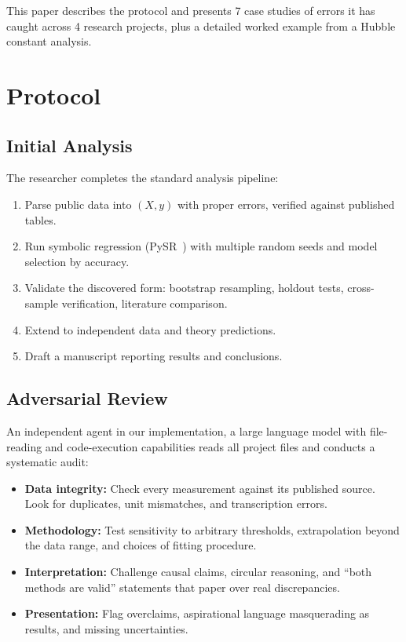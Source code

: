 \documentclass[twocolumn]{aastex631}
\begin{document}
This paper describes the protocol and presents 7 case studies of errors
it has caught across 4 research projects, plus a detailed worked example
from a Hubble constant analysis.

\section{Protocol}

\subsection{Initial Analysis}

The researcher completes the standard analysis pipeline:
\begin{enumerate}
  \item Parse public data into $(X,y)$ with proper errors, verified against
        published tables.
  \item Run symbolic regression (PySR~\cite{pysr}) with multiple random seeds
        and model selection by accuracy.
  \item Validate the discovered form: bootstrap resampling, holdout tests,
        cross-sample verification, literature comparison.
  \item Extend to independent data and theory predictions.
  \item Draft a manuscript reporting results and conclusions.
\end{enumerate}

\subsection{Adversarial Review}

An independent agent \textemdash{} in our implementation, a large language
model with file-reading and code-execution capabilities \textemdash{} reads
all project files and conducts a systematic audit:

\begin{itemize}
  \item \textbf{Data integrity:} Check every measurement against its
        published source.  Look for duplicates, unit mismatches, and
        transcription errors.
  \item \textbf{Methodology:} Test sensitivity to arbitrary thresholds,
        extrapolation beyond the data range, and choices of fitting
        procedure.
  \item \textbf{Interpretation:} Challenge causal claims, circular
        reasoning, and ``both methods are valid'' statements that paper
        over real discrepancies.
  \item \textbf{Presentation:} Flag overclaims, aspirational language
        masquerading as results, and missing uncertainties.
\end{itemize}
\end{document}
